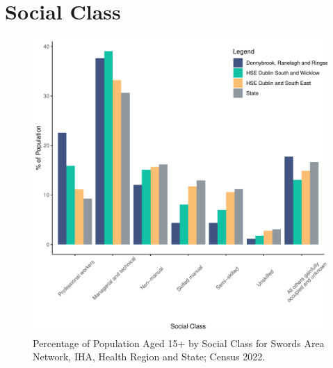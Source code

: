 \documentclass{article}
\begin{document}
\section{Social Class}\label{sect:SC}
\begin{figure}[H]
	\centering
	\includegraphics[width = 140mm]{../figures/SocialClassED.pdf}
	\caption{Percentage of Population Aged 15+ by Social Class for Swords Area Network, IHA, Health Region and State; Census 2022.}
	\label{fig:vbnv}
	\end{figure}
\end{document}
